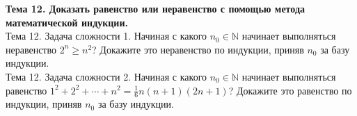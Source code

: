\documentclass[12pt,oneside]{article}
\theoremstyle{definition}
\begin{document}
{\bf Тема 12. Доказать равенство или неравенство с помощью метода математической индукции.}\\

Тема 12. Задача сложности 1. Начиная с какого $n_0\in\mathbb{N}$ начинает выполняться неравенство $2^n\geq n^2$? Докажите это неравенство по индукции, приняв $n_0$ за базу индукции.\\

Тема 12. Задача сложности 2. Начиная с какого $n_0\in\mathbb{N}$ начинает выполняться равенство $1^2+2^2+\cdots+n^2=\frac{1}{6}n(n+1)(2n+1)$? Докажите это равенство по индукции, приняв $n_0$ за базу индукции.
\end{document}
